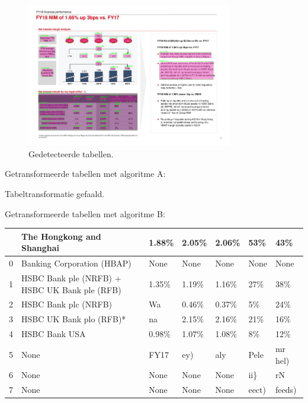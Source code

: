 \begin{figure}[H]
    \centering
    \includegraphics[width=0.8\textwidth]{test-resultaten/4/detected_tables.png}
    \caption{Gedetecteerde tabellen.}
\end{figure}

Getransformeerde tabellen met algoritme A:

Tabeltransformatie gefaald.

Getransformeerde tabellen met algoritme B:

\begin{tabular}{lllllll}
\toprule
{} &                      The Hongkong and Shanghai &  1.88\% &  2.05\% &  2.06\% &    53\% &      43\% \\
\midrule
0 &                     Banking Corporation (HBAP) &   None &   None &   None &   None &     None \\
1 &  HSBC Bank ple (NRFB) + HSBC UK Bank ple (RFB) &  1.35\% &  1.19\% &  1.16\% &    27\% &      38\% \\
2 &                           HSBC Bank plc (NRFB) &     Wa &  0.46\% &  0.37\% &     5\% &      24\% \\
3 &                        HSBC UK Bank plo (RFB)* &     na &  2.15\% &  2.16\% &    21\% &      16\% \\
4 &                                  HSBC Bank USA &  0.98\% &  1.07\% &  1.08\% &     8\% &      12\% \\
5 &                                           None &   FY17 &    ey) &    aly &   Pele &  mr hel) \\
6 &                                           None &   None &   None &   None &    ii\} &       rN \\
7 &                                           None &   None &   None &   None &  eect) &   feeds) \\
\bottomrule
\end{tabular}
